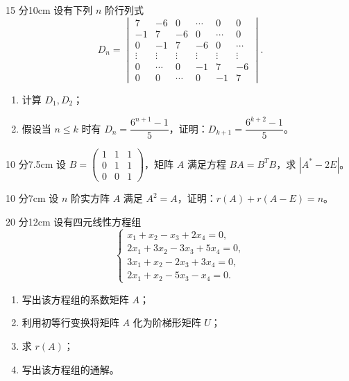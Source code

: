 
\begin{problem}{15 分}{10cm}
设有下列 $n$ 阶行列式
\[
D_n=\begin{vmatrix}
7&-6&0&\cdots&0&0\\
-1&7&-6&0&\cdots&0\\
0&-1&7&-6&0&\cdots\\
\vdots&\vdots&\vdots&\vdots&\vdots&\vdots\\
0&\cdots&0&-1&7&-6\\
0&0&\cdots&0&-1&7
\end{vmatrix}.
\]
\begin{enumerate}[label=(\arabic*),leftmargin=2.2em,itemsep=0.25em,topsep=0.3em]
  \item 计算 $D_1,D_2$；
  \item 假设当 $n\le k$ 时有 $D_n=\dfrac{6^{n+1}-1}{5}$，证明：$D_{k+1}=\dfrac{6^{k+2}-1}{5}$。
\end{enumerate}
\end{problem}

\begin{problem}{10 分}{7.5cm}
设 $B=\begin{pmatrix}1&1&1\\0&1&1\\0&0&1\end{pmatrix}$，矩阵 $A$ 满足方程 $BA=B^{T}B$，求 $|A^{*}-2E|$。
\end{problem}

\begin{problem}{10 分}{7cm}
设 $n$ 阶实方阵 $A$ 满足 $A^{2}=A$，证明：$r(A)+r(A-E)=n$。
\end{problem}

\begin{problem}{20 分}{12cm}
设有四元线性方程组
\[
\begin{cases}
x_1+x_2-x_3+2x_4=0,\\
2x_1+3x_2-3x_3+5x_4=0,\\
3x_1+x_2-2x_3+3x_4=0,\\
2x_1+x_2-5x_3-x_4=0.
\end{cases}
\]
\begin{enumerate}[label=(\arabic*),leftmargin=2.2em,itemsep=0.25em,topsep=0.3em]
  \item 写出该方程组的系数矩阵 $A$；
  \item 利用初等行变换将矩阵 $A$ 化为阶梯形矩阵 $U$；
  \item 求 $r(A)$；
  \item 写出该方程组的通解。
\end{enumerate}
\end{problem}

